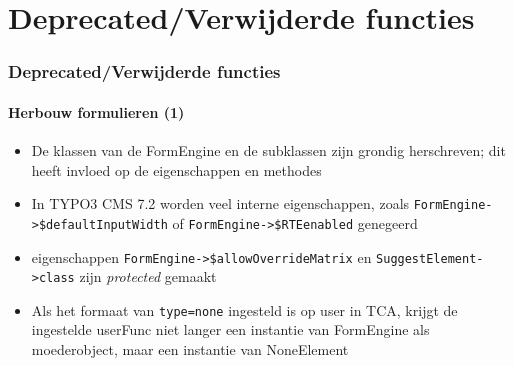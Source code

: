 %

\section{Deprecated/Verwijderde functies}


\begin{frame}[fragile]
	\frametitle{Deprecated/Verwijderde functies}
	\framesubtitle{Herbouw formulieren (1)}

	\begin{itemize}

		\item De klassen van de FormEngine en de subklassen zijn grondig herschreven; dit
		 	heeft invloed op de eigenschappen en methodes

		\item In TYPO3 CMS 7.2 worden veel interne eigenschappen, zoals
			\small\texttt{FormEngine->\$defaultInputWidth}\normalsize\space
			of
			\small\texttt{FormEngine->\$RTEenabled}\normalsize\space\newline
			genegeerd

		\item eigenschappen
			\small\texttt{FormEngine->\$allowOverrideMatrix}\normalsize\space
			en
			\small\texttt{SuggestElement->class}\normalsize\space
			zijn \textit{protected} gemaakt

		\item Als het formaat van \texttt{type=none} ingesteld is op user in TCA, krijgt de ingestelde
			userFunc niet langer een instantie van FormEngine als moederobject,
			maar een instantie van NoneElement

	\end{itemize}

\end{frame}

